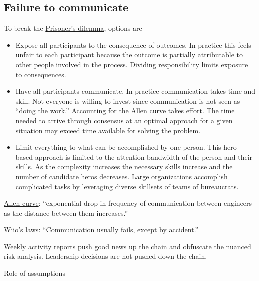 \subsection{Failure to communicate\label{sec:failure-to-comm}}

To break the \href{https://en.wikipedia.org/wiki/Prisoner\%27s\_dilemma}{Prisoner's dilemma}, options are 
\begin{itemize}
    \item Expose all participants to the consequence of outcomes. In practice this feels unfair to each participant because the outcome is partially attributable to other people involved in the process. Dividing responsibility limits exposure to consequences.
    \item Have all participants communicate. In practice communication takes time and skill. Not everyone is willing to invest since communication is not seen as ``doing the work.'' Accounting for the \href{https://en.wikipedia.org/wiki/Allen\_curve}{Allen curve} takes effort. The time needed to arrive through consensus at an optimal approach for a given situation may exceed time available for solving the problem.
    \item Limit everything to what can be accomplished by one person. This hero-based approach is limited to the attention-bandwidth of the person and their skills. As the complexity increases the necessary skills increase and the number of candidate heros decreases. Large organizations accomplish complicated tasks by leveraging diverse skillsets of teams of bureaucrats.

\end{itemize}


 
 
\href{https://en.wikipedia.org/wiki/Allen_curve}{Allen curve}: ``exponential drop in frequency of communication between engineers as the distance between them increases.''

\href{https://en.wikipedia.org/wiki/Wiio\%27s_laws}{Wiio's laws}: ``Communication usually fails, except by accident.''


Weekly activity reports push good news up the chain and obfuscate the nuanced risk analysis. 
Leadership decisions are not pushed down the chain.

Role of assumptions 



